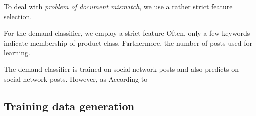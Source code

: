 To deal with \emph{problem of document mismatch}, we use a rather strict feature selection.


For the demand classifier, we employ a strict feature
Often, only a few keywords indicate membership of product class.
Furthermore, the number of posts used for learning.


The demand classifier is trained on social network posts and also predicts on social network posts.
However, as
According to


\subsection{Training data generation}


